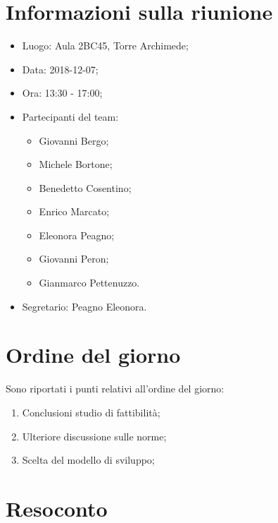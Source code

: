 \documentclass[11pt,a4paper]{article}
\begin{document}
	\section{Informazioni sulla riunione}
	\begin{itemize}
	\item Luogo: Aula 2BC45, Torre Archimede;
	\item Data: 2018-12-07;
	\item Ora: 13:30 - 17:00;
	\item Partecipanti del team: 
	\begin{itemize}
		\item Giovanni Bergo;
		\item Michele Bortone;
		\item Benedetto Cosentino;
		\item Enrico Marcato;
		\item Eleonora Peagno;
		\item Giovanni Peron;
		\item Gianmarco Pettenuzzo.
	\end{itemize}
	\item Segretario: Peagno Eleonora.
	\end{itemize}

	\section{Ordine del giorno}
	Sono riportati i punti relativi all'ordine del giorno:
	\begin{enumerate}
	\item Conclusioni studio di fattibilità;
	\item Ulteriore discussione sulle norme;
	\item Scelta del modello di sviluppo; 
	\end{enumerate}
	
	\section{Resoconto}	
\end{document}
